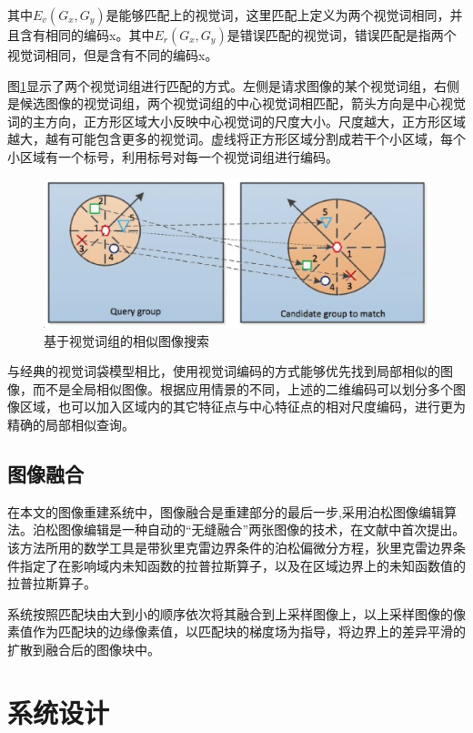 \documentclass[UTF8]{csoarticle}
\begin{document}
其中\(E_v(G_x,G_y)\)是能够匹配上的视觉词，这里匹配上定义为两个视觉词相同，并且含有相同的编码x。其中\(E_r(G_x,G_y)\)是错误匹配的视觉词，错误匹配是指两个视觉词相同，但是含有不同的编码x。

图\ref{fig:visual}显示了两个视觉词组进行匹配的方式。左侧是请求图像的某个视觉词组，右侧是候选图像的视觉词组，两个视觉词组的中心视觉词相匹配，箭头方向是中心视觉词的主方向，正方形区域大小反映中心视觉词的尺度大小。尺度越大，正方形区域越大，越有可能包含更多的视觉词。虚线将正方形区域分割成若干个小区域，每个小区域有一个标号，利用标号对每一个视觉词组进行编码。

\begin{figure}
\centering\includegraphics[width=12cm]{visual_group}
\caption{基于视觉词组的相似图像搜索}
\label{fig:visual}
\end{figure}

与经典的视觉词袋模型相比，使用视觉词编码的方式能够优先找到局部相似的图像，而不是全局相似图像。根据应用情景的不同，上述的二维编码可以划分多个图像区域，也可以加入区域内的其它特征点与中心特征点的相对尺度编码，进行更为精确的局部相似查询。

\subsection{图像融合}
在本文的图像重建系统中，图像融合是重建部分的最后一步,采用泊松图像编辑算法。泊松图像编辑是一种自动的“无缝融合”两张图像的技术，在文献\cite{Perez:2003ul}中首次提出。该方法所用的数学工具是带狄里克雷边界条件的泊松偏微分方程，狄里克雷边界条件指定了在影响域内未知函数的拉普拉斯算子，以及在区域边界上的未知函数值的拉普拉斯算子\cite{张建桥:2010vm}。

系统按照匹配块由大到小的顺序依次将其融合到上采样图像上，以上采样图像的像素值作为匹配块的边缘像素值，以匹配块的梯度场为指导，将边界上的差异平滑的扩散到融合后的图像块中。

\section{系统设计}
\end{document}
